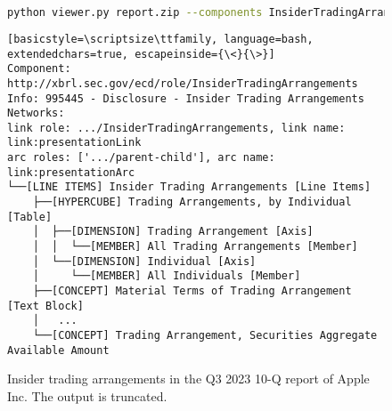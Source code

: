 \begin{figure}[H]
    \begin{lstlisting}[language=bash]
python viewer.py report.zip --components InsiderTradingArrangements
\end{lstlisting}
    \begin{lstlisting}[basicstyle=\scriptsize\ttfamily, language=bash, extendedchars=true, escapeinside={\<}{\>}]
Component: http://xbrl.sec.gov/ecd/role/InsiderTradingArrangements
Info: 995445 - Disclosure - Insider Trading Arrangements
Networks: 
link role: .../InsiderTradingArrangements, link name: link:presentationLink
arc roles: ['.../parent-child'], arc name: link:presentationArc
└──[LINE ITEMS] Insider Trading Arrangements [Line Items]
    ├──[HYPERCUBE] Trading Arrangements, by Individual [Table]
    │  ├──[DIMENSION] Trading Arrangement [Axis]
    │  │  └──[MEMBER] All Trading Arrangements [Member]
    │  └──[DIMENSION] Individual [Axis]
    │     └──[MEMBER] All Individuals [Member]
    ├──[CONCEPT] Material Terms of Trading Arrangement [Text Block]
    │   ...
    └──[CONCEPT] Trading Arrangement, Securities Aggregate Available Amount
\end{lstlisting}
\caption{Insider trading arrangements in the Q3 2023 10-Q report of Apple Inc. The output is truncated.}

\label{fig:aapl_insider_trading}
\end{figure}



